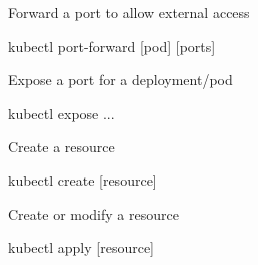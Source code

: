 \documentclass{refcard}
\begin{document}
Forward a port to allow external access
\begin{ttyenv}
kubectl port-forward [pod] [ports]
\end{ttyenv}

Expose a port for a deployment/pod
\begin{ttyenv}
kubectl expose ...
\end{ttyenv}

Create a resource
\begin{ttyenv}
kubectl create [resource]
\end{ttyenv}

Create or modify a resource
\begin{ttyenv}
kubectl apply [resource]
\end{ttyenv}




\rflicense
\end{document}
